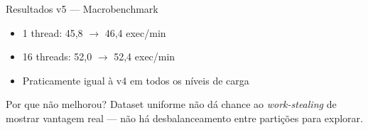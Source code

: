 \begin{frame}{Resultados v5 --- Macrobenchmark}
    \begin{itemize}
        \item 1 thread: 45,8 $\to$ \alert{46,4 exec/min}
        \item 16 threads: 52,0 $\to$ \alert{52,4 exec/min}
        \item Praticamente igual à v4 em todos os níveis de carga
    \end{itemize}

    \vspace{0.8em}
    \begin{block}{Por que não melhorou?}
        Dataset uniforme não dá chance ao \textit{work-stealing} de mostrar
        vantagem real --- não há desbalanceamento entre partições para
        explorar.
    \end{block}
\end{frame}
